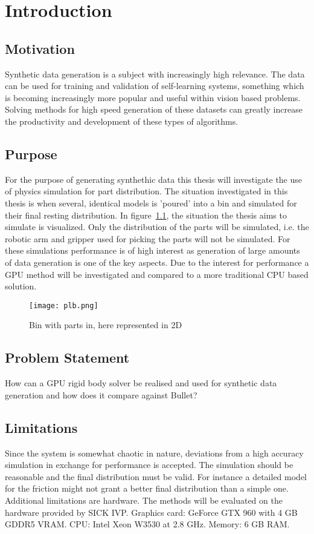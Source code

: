 \chapter{Introduction}\label{cha:intro}

\section{Motivation}

Synthetic data generation is a subject with increasingly high relevance.
The data can be used for training and validation of self-learning systems,
something which is becoming increasingly more popular and useful within vision
based problems. Solving methods for high speed generation of these datasets
can greatly increase the productivity and development of these
types of algorithms.

\section{Purpose}

For the purpose of generating synthethic data this thesis will investigate the use of physics
simulation for part distribution. The situation investigated in this thesis
is when several, identical models is  'poured' into a bin and simulated for their
final resting distribution. In figure~\ref{fig:plb}, the situation
the thesis aims to simulate is visualized. Only the distribution of the parts
will be simulated, i.e. the robotic arm and gripper used for picking the parts will not be simulated. For these simulations
performance is of high interest as generation of large amounts of data generation
is one of the key aspects. Due to the interest for performance a GPU method will
be investigated and compared to a more traditional CPU based solution.

\begin{figure}[ht]
  \centering
  \texttt{[image: plb.png]}
  \caption{Bin with parts in, here represented in 2D}
  \label{fig:plb}
\end{figure}

\section{Problem Statement}
How can a GPU rigid body solver be realised and used for synthetic data generation
 and how does it compare against Bullet?

\section{Limitations}
Since the system is somewhat chaotic in nature, deviations from a high accuracy
simulation in exchange for performance is accepted. The simulation should be reasonable
and the final distribution must be valid. For instance a detailed
model for the friction might not grant a better final distribution than a simple one.
Additional limitations are hardware. The methods will be evaluated on the hardware
provided by SICK IVP. Graphics card: GeForce GTX 960 with 4 GB GDDR5 VRAM.
CPU: Intel Xeon W3530 at 2.8 GHz.
Memory: 6 GB RAM.

